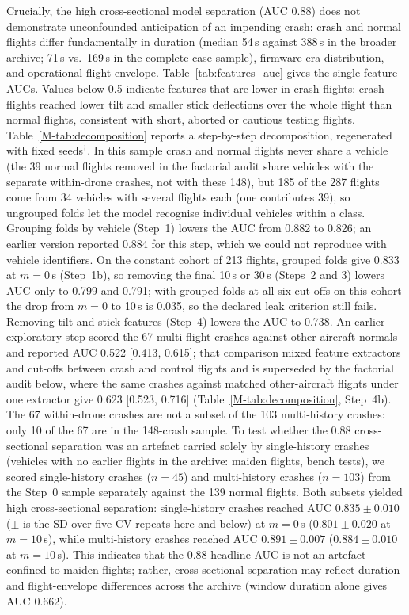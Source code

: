 \documentclass[preprint,12pt]{elsarticle}
\begin{document}
Crucially, the high cross-sectional model separation (AUC 0.88) does not demonstrate unconfounded anticipation of an
impending crash: crash and normal flights differ fundamentally in duration (median 54\,s against 388\,s in the broader archive;
71\,s vs.\ 169\,s in the complete-case sample), firmware era distribution, and operational flight envelope. Table~\ref{tab:features_auc}
gives the single-feature AUCs. Values below 0.5 indicate features that are lower in crash flights: crash flights reached lower tilt
and smaller stick deflections over the whole flight than normal flights, consistent with short, aborted or cautious testing flights.
Table~\ref{M-tab:decomposition} reports a step-by-step decomposition, regenerated with fixed seeds$^\dagger$. In this sample crash and normal flights never share a vehicle (the 39 normal flights removed in the factorial audit share vehicles with the separate within-drone crashes, not with these 148), but 185 of the 287 flights come from 34 vehicles with several flights each (one contributes 39), so ungrouped folds let the model recognise individual vehicles within a class. Grouping folds by vehicle (Step~1) lowers the AUC from 0.882 to 0.826; an earlier version reported 0.884 for this step, which we could not reproduce with vehicle identifiers. On the constant cohort of 213 flights, grouped folds give 0.833 at $m=0$\,s (Step~1b), so removing the final 10\,s or 30\,s (Steps~2 and 3) lowers AUC only to 0.799 and 0.791; with grouped folds at all six cut-offs on this cohort the drop from $m=0$ to 10\,s is 0.035, so the declared leak criterion still fails. Removing tilt and stick features (Step~4) lowers the AUC to 0.738. An earlier exploratory step scored the 67 multi-flight crashes against other-aircraft normals and reported AUC 0.522 [0.413, 0.615]; that comparison mixed feature extractors and cut-offs between crash and control flights and is superseded by the factorial audit below, where the same crashes against matched other-aircraft flights under one extractor give 0.623 [0.523, 0.716] (Table~\ref{M-tab:decomposition}, Step~4b). The 67 within-drone crashes are not a subset of the 103 multi-history crashes: only 10 of the 67 are in the 148-crash sample. To test whether the 0.88 cross-sectional separation was an artefact carried solely by single-history crashes (vehicles with no earlier flights in the archive: maiden flights, bench tests), we scored single-history crashes ($n=45$) and multi-history crashes ($n=103$) from the Step~0 sample separately against the 139 normal flights. Both subsets yielded high cross-sectional separation: single-history crashes reached AUC $0.835 \pm 0.010$ ($\pm$ is the SD over five CV repeats here and below) at $m=0$\,s ($0.801 \pm 0.020$ at $m=10$\,s), while multi-history crashes reached AUC $0.891 \pm 0.007$ ($0.884 \pm 0.010$ at $m=10$\,s). This indicates that the 0.88 headline AUC is not an artefact confined to maiden flights; rather, cross-sectional separation may reflect duration and flight-envelope differences across the archive (window duration alone gives AUC 0.662).
\end{document}
